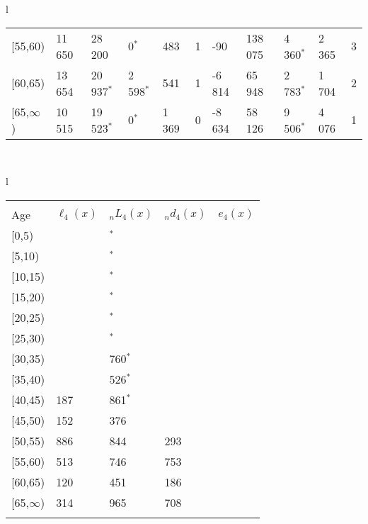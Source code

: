 \documentclass[
]{article}
\begin{document}
\begin{table}
\begin{tabular}[t]{l}
\begin{tabular}
{}[55,60) & 11 650 & 28 200 & 0$^{*}$ & 483 & 1 & -90 & 138 075 & 4 360$^{*}$ & 2 365 & 3\\
{}[60,65) & 13 654 & 20 937$^{*}$ & 2 598$^{*}$ & 541 & 1 & -6 814 & 65 948 & 2 783$^{*}$ & 1 704 & 2\\
{}[65,$\infty$) & 10 515 & 19 523$^{*}$ & 0$^{*}$ & 1 369 & 0 & -8 634 & 58 126 & 9 506$^{*}$ & 4 076 & 1\\
\end{tabular}\\
\end{tabular}
\centering
\begin{tabular}[t]{l}
\hline
\begin{tabular}{>{\raggedright\arraybackslash}p{.43in}>{\raggedleft\arraybackslash}p{1.3in}>{\raggedleft\arraybackslash}p{1.3in}>{\raggedleft\arraybackslash}p{1.3in}>{\raggedleft\arraybackslash}p{1.3in}}
\toprule
\multicolumn{1}{c}{ } & \multicolumn{4}{c}{(4) Lost both} \\
\cmidrule(l{3pt}r{3pt}){2-5}
Age & $\ell_{4}(x)$ & ${}_nL_{4}(x)$ & ${}_nd_{4}(x)$ & $e_{4}(x)$\\
\midrule
{}[0,5) & 0 & 0$^{*}$ & 0 & 14\\
{}[5,10) & 0 & 0$^{*}$ & 0 & 15\\
{}[10,15) & 0 & 0$^{*}$ & 0 & 15\\
{}[15,20) & 0 & 0$^{*}$ & 0 & 15\\
{}[20,25) & 0 & 0$^{*}$ & 0 & 15\\
\addlinespace
{}[25,30) & 0 & 0$^{*}$ & 0 & 15\\
{}[30,35) & 0 & 18 760$^{*}$ & 74 & 15\\
{}[35,40) & -74 & 21 526$^{*}$ & 105 & 15\\
{}[40,45) & 7 187 & 5 861$^{*}$ & 36 & 15\\
{}[45,50) & 7 152 & 53 376 & 435 & 16\\
\addlinespace
{}[50,55) & 16 886 & 112 844 & 1 293 & 16\\
{}[55,60) & 38 513 & 160 746 & 2 753 & 15\\
{}[60,65) & 40 120 & 239 451 & 6 186 & 15\\
{}[65,$\infty$) & 39 314 & 822 965 & 57 708 & 13\\
\bottomrule
\multicolumn{5}{l}{\rule{0pt}{1em}\textsuperscript{*} Based on an estimated from SIPP with less than 10 respondents in the numerator.}\\
\end{tabular}\\
\end{tabular}
\end{table}
\end{document}
